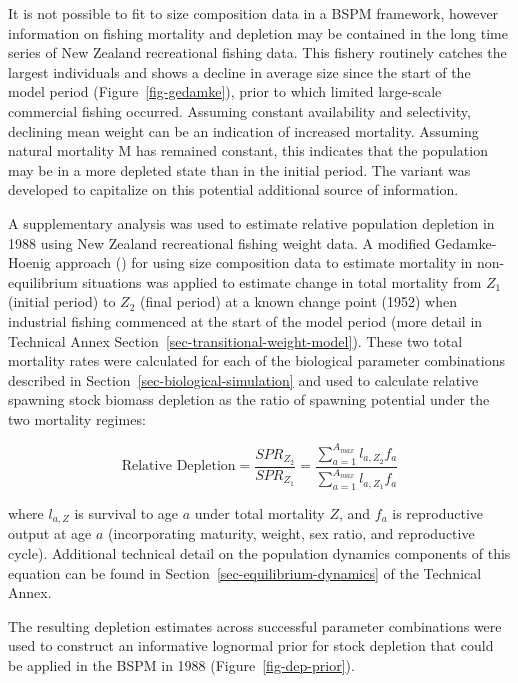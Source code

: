 \documentclass[
  11pt,
]{SCreport}
\begin{document}
It is not possible to fit to size composition data in a BSPM framework,
however information on fishing mortality and depletion may be contained
in the long time series of New Zealand recreational fishing data. This
fishery routinely catches the largest individuals and shows a decline in
average size since the start of the model period
(Figure~\ref{fig-gedamke}), prior to which limited large-scale
commercial fishing occurred. Assuming constant availability and
selectivity, declining mean weight can be an indication of increased
mortality. Assuming natural mortality M has remained constant, this
indicates that the population may be in a more depleted state than in
the initial period. The  variant was
developed to capitalize on this potential additional source of
information.

A supplementary analysis was used to estimate relative population
depletion in 1988 using New Zealand recreational fishing weight data. A
modified Gedamke-Hoenig approach
() for
using size composition data to estimate mortality in non-equilibrium
situations was applied to estimate change in total mortality from
\(Z_1\) (initial period) to \(Z_2\) (final period) at a known change
point (1952) when industrial fishing commenced at the start of the model
period (more detail in Technical Annex
Section~\ref{sec-transitional-weight-model}). These two total mortality
rates were calculated for each of the biological parameter combinations
described in Section~\ref{sec-biological-simulation} and used to
calculate relative spawning stock biomass depletion as the ratio of
spawning potential under the two mortality regimes:

\[\text{Relative Depletion} = \frac{SPR_{Z_2}}{SPR_{Z_1}} = \frac{\sum_{a=1}^{A_{max}} l_{a,Z_2} f_a}{\sum_{a=1}^{A_{max}} l_{a,Z_1} f_a}\]

where \(l_{a,Z}\) is survival to age \(a\) under total mortality \(Z\),
and \(f_a\) is reproductive output at age \(a\) (incorporating maturity,
weight, sex ratio, and reproductive cycle). Additional technical detail
on the population dynamics components of this equation can be found in
Section~\ref{sec-equilibrium-dynamics} of the Technical Annex.

The resulting depletion estimates across successful parameter
combinations were used to construct an informative lognormal prior for
stock depletion that could be applied in the BSPM in 1988
(Figure~\ref{fig-dep-prior}).
\end{document}
